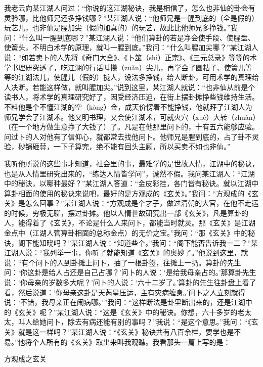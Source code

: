 \documentclass[12pt,UTF8]{ctexbook}
\begin{document}
我老云向某江湖人问过：“你说的这江湖秘诀，我是相信了，怎么也非仙的卦会有灵验哪，比他师兄还多挣钱哪？”某江湖人说：“他师兄是一腥到底的（全是假的）玩艺儿，也非仙是腥加尖（假的加真的）的玩艺，故此比他师兄多挣钱。”我问：“什么叫一腥到底哪？”某江湖人说：“他们算卦的若是净会使手段、使腥盘、使簧头，不明白术学的原理，就叫一腥到底。”我问：“什么叫腥加尖哪？”某江湖人说：“如若卖卜的人先将《奇门大全》、《卜筮（shì）正宗》、《三元总录》等等的术学书理研究透了，吃江湖的行话叫攥（zuǎn）尖儿，再学会了圆粘子、使簧儿等等的江湖法儿，使腥儿（假的）拢人，设法多挣钱，给人断卦，可用术学的真理给人决断。若能这样做，就叫腥加尖。”说到这里，某江湖人就说：“也非仙从前是个读书人，将术学的真理研究好了，因受经济压迫，在街上摆卦摊挣些钱维持生活。不料他是个不懂江湖的空（kòng）金，成天价愣着不能挣钱，他就拜了江湖人为师兄学会了江湖术。他又明书理，又会使江湖术，可就火穴（xué）大转（zhuàn）（在一个地方做生意挣了大钱了）了。凡是在他那里问卜的，十有五六能够应验。问过卜的人对他有了信仰心，就都常去找他问卜。他师兄是腥到底的，占了卦不灵验，砂锅砸蒜，一下子算完，绝不能有回头主顾，所以买卖不如也非仙。”

我听他所说的这些事才知道，社会里的事，最难学的是世故人情，江湖中的秘诀，也是从人情里研究出来的，“练达人情皆学问”，诚然不假。我问某江湖人：“江湖中的秘诀，以哪种最好？”某江湖人答道：“金皮彩挂，各门皆有秘诀。就以江湖中算卦相面的使用的秘诀来说吧，最好的是方观成的《玄关》。”我问：“方观成的《玄关》是怎么回事？”某江湖人说：“方观成是个才子，做过清朝的大官，在他不走运的时候，穷极无聊，摆过卦摊。他以人情世故研究出一部《玄关》，凡是算卦的人，能得着了《玄关》，不论是什么人来问卜，都能当时就灵。那《玄关》是江湖金点中（江湖人管算卦相面的总称金点）的无价之宝。”我问：“那《玄关》中的秘诀，阁下能知晓吗？”某江湖人说：“知道些个。”我问：“阁下能否告诉我一二？”某江湖人说：“我列举一事，你听了就能知道《玄关》的奥妙了。”他说到这里，就说：“有个问卜的人到卦摊上问卜，抽了一根卦签，往摊上一扔。算卦的先生问：‘你这卦是给人占还是自己占哪？’问卜的人说：‘是给我母亲占的。’那算卦先生说：‘你母亲的岁数多大呢？’问卜的人说：‘六十二岁了。’算卦的先生往卦盘上看了看，然后说道：‘你母亲这卦是天芮星压运，主有灾病缠身。’问卜之人立刻就得说：‘不错，我母亲正在闹病哪。’”我问：“这样断法是卦里断出来的，还是江湖中的《玄关》呢？”某江湖人说：“这是《玄关》中的秘诀。你想，六十多岁的老太太，叫人给她问卜，除去有病还能有别的事吗？”我说：“是这个意思。”我问：“《玄关》就是这一样吗？”某江湖人说：“《玄关》秘诀共有八百余样，要学也是不易。”他将个人所有的《玄关》取出来叫我观瞧。我看那头一篇上写的是：

方观成之玄关
\end{document}
